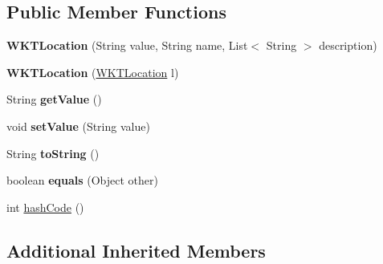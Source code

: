 \subsection*{Public Member Functions}
\begin{DoxyCompactItemize}
\item 
\mbox{\label{classeu_1_1h2020_1_1symbiote_1_1model_1_1cim_1_1WKTLocation_a8e26ca9a7ba9d290b2b7248d9fb9ed15}} 
{\bfseries W\+K\+T\+Location} (String value, String name, List$<$ String $>$ description)
\item 
\mbox{\label{classeu_1_1h2020_1_1symbiote_1_1model_1_1cim_1_1WKTLocation_a14c2a878b7615d2024b0056eee3eb541}} 
{\bfseries W\+K\+T\+Location} (\hyperlink{classeu_1_1h2020_1_1symbiote_1_1model_1_1cim_1_1WKTLocation}{W\+K\+T\+Location} l)
\item 
\mbox{\label{classeu_1_1h2020_1_1symbiote_1_1model_1_1cim_1_1WKTLocation_acc25e43bf58d654e6b7efda5abaca233}} 
String {\bfseries get\+Value} ()
\item 
\mbox{\label{classeu_1_1h2020_1_1symbiote_1_1model_1_1cim_1_1WKTLocation_a74b0dc25641dd219679a46d7b9c24a06}} 
void {\bfseries set\+Value} (String value)
\item 
\mbox{\label{classeu_1_1h2020_1_1symbiote_1_1model_1_1cim_1_1WKTLocation_a46fff50acfa20de4c704a993df15b79e}} 
String {\bfseries to\+String} ()
\item 
\mbox{\label{classeu_1_1h2020_1_1symbiote_1_1model_1_1cim_1_1WKTLocation_ac79e27691cdf68e2ab6332ace3277968}} 
boolean {\bfseries equals} (Object other)
\item 
int \hyperlink{classeu_1_1h2020_1_1symbiote_1_1model_1_1cim_1_1WKTLocation_ae40b93be056d75c23dbd943bbf6bb27d}{hash\+Code} ()
\end{DoxyCompactItemize}
\subsection*{Additional Inherited Members}



